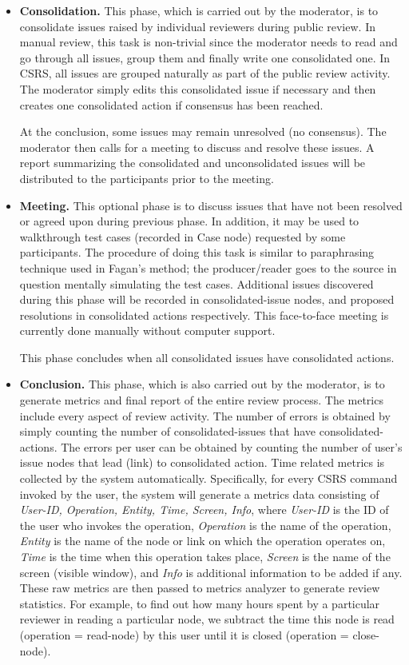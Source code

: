 \begin {itemize}
This phase concludes when reviewers have responded to all commentary
nodes.

\item {\bf Consolidation.}
This phase, which is carried out by the moderator,
is to consolidate issues raised by individual reviewers during public
review. In manual review, this task is  non-trivial since the moderator
needs to read and go through all issues, group them and finally write one
consolidated one. In CSRS, all issues are grouped naturally as part of
the public review activity.
The moderator simply edits this consolidated issue if necessary and
then creates one consolidated action if consensus has been reached.

At the conclusion, some issues may remain unresolved (no consensus). 
The moderator then calls for a meeting to discuss and resolve these
issues.  A report summarizing the consolidated and unconsolidated
issues will be distributed to the participants prior to the meeting.

\item {\bf Meeting.}
This optional phase is to discuss issues that have not been
resolved or agreed upon during previous phase. In addition, it may be
used to walkthrough test cases (recorded in Case node) requested by
some participants. The procedure of doing this task is similar to
paraphrasing technique used in Fagan's method; the producer/reader
goes to the source in question mentally simulating the test cases.
Additional issues discovered during this phase will be recorded in
consolidated-issue nodes, and proposed resolutions in consolidated
actions respectively. This face-to-face meeting is currently done
manually without computer support.

This phase concludes when all consolidated issues have consolidated
actions. 

\item {\bf Conclusion.}
This phase, which is also carried out by the moderator, is to generate
metrics and final report of the entire review process.  The metrics
include every 
aspect of review activity. The number of errors is obtained by
simply counting the number of consolidated-issues that have
consolidated-actions.
The errors per user can be obtained by counting the number of  user's
issue nodes that lead (link) to consolidated action.
Time related metrics  is collected by the system automatically.
Specifically, for every CSRS command invoked by the user, the system
will generate a metrics data consisting of {\sl User-ID, Operation, Entity,
Time, Screen, Info},  where {\sl User-ID} is the ID of the user who
invokes the operation, {\sl Operation} is the name of the operation,
{\sl Entity} is the name of the node or link on which the operation
operates on, {\sl Time} is the time when this operation takes place,
{\sl Screen} is the name of the screen (visible window), and {\sl Info}
is additional information to be added if any. These raw metrics are then passed
to metrics analyzer to generate review statistics.
For example, to find out how many hours spent by a particular
reviewer in reading a particular node, we subtract the
time this node is read (operation = read-node) by this user 
until it is closed (operation = close-node).


\end{itemize}
